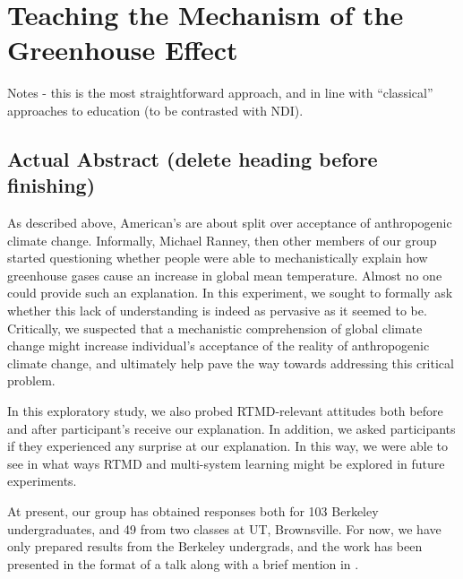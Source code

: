 \graphicspath{{mechanism/}}

\chapter{Teaching the Mechanism of the Greenhouse Effect}
\label{chap:mechanism}


Notes - this is the most straightforward approach, and in line with
``classical''
approaches to education (to be contrasted with NDI).

\section{Actual Abstract (delete heading before finishing)}

As described above, American's are about split over acceptance of anthropogenic
climate change. Informally, Michael Ranney, then other members of our group
started questioning whether people were able to mechanistically explain how
greenhouse gases cause an increase in global mean temperature. Almost no one
could provide such an explanation. In this experiment, we sought to formally ask
whether this lack of understanding is indeed as pervasive as it seemed to be.
Critically, we suspected that a mechanistic comprehension of global climate
change might increase individual's acceptance of the reality of anthropogenic
climate change, and ultimately help pave the way towards addressing this
critical problem.

In this exploratory study, we also probed RTMD-relevant attitudes both
before and after participant's receive our explanation. In addition, we asked
participants if they experienced any surprise at our explanation. In this way,
we were able to see in what ways RTMD and multi-system learning might be
explored in future experiments.


At present, our group has obtained responses both for 103 Berkeley
undergraduates, and 49 from two classes at UT, Brownsville. For now, we have
only prepared results from the Berkeley undergrads, and the work has been
presented in the format of a talk along with a brief mention in
\citeauthor{ranney_why_inpress}.  

